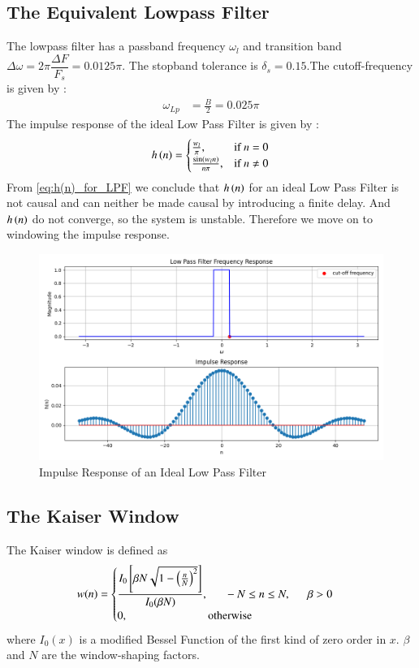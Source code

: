 \documentclass[journal,12pt,twocolumn]{IEEEtran}
\theoremstyle{remark}
\begin{document}
\subsection{The Equivalent Lowpass Filter}
The lowpass filter has a passband frequency $\omega_l$ and transition band $\Delta \omega = 2\pi \dfrac{\Delta F}{F_s} = 0.0125\pi$.
The stopband tolerance is $\delta_s = 0.15$.The cutoff-frequency is given by :
\begin{align}
    \omega_{Lp} &= \frac{B}{2} =  0.025\pi
\end{align}
The impulse response of the ideal Low Pass Filter is given by :
\begin{align}
    h\left(n\right) = 
\begin{cases} 
    \frac{w_l}{\pi}, & \text{if } n = 0 \\
    \frac{\sin(w_l n)}{n\pi}, & \text{if } n \neq 0
\end{cases} \label{eq:h(n)_for_LPF}
\end{align}
From \eqref{eq:h(n)_for_LPF} we conclude that $h\left(n\right)$ for an ideal Low Pass Filter is not causal and can neither be made causal by introducing a finite delay. And $h\left(n\right)$ do not converge, so the system is unstable. Therefore we move on to windowing the impulse response.
\begin{figure}
    \centering
    \includegraphics[width = \columnwidth]{figs/Impulse Response.png}
    \caption{Impulse Response of an Ideal Low Pass Filter}
    \label{fig:ideal_LPF}
\end{figure}
\subsection{The Kaiser Window}
The Kaiser window is defined as
\begin{align}
    w(n) =
    \begin{cases}
    \dfrac{I_0\left[ \beta N \sqrt{1 - \left(\frac{n}{N}\right)^2} \right]}{I_0(\beta N)},
\indent -N \leq n \leq N, \indent \beta > 0 \nonumber \\
 0, \hspace{2.5 cm} \mbox{otherwise}
 \end{cases}
\end{align}
where $I_0(x)$ is a modified Bessel Function of the first kind of zero order in $x$. $\beta$ and $N$ are the window-shaping factors.
\end{document}
